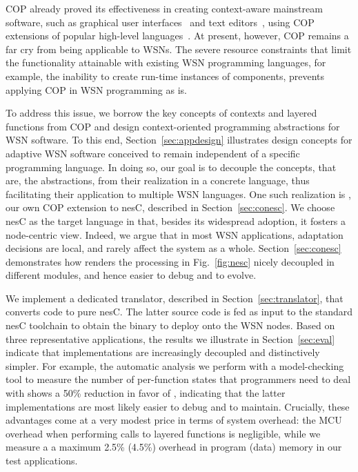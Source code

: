COP already proved its effectiveness in creating context-aware
mainstream software, such as graphical user interfaces~\cite{Keays03}
and text editors~\cite{Kamina11}, using COP extensions of popular
high-level languages~\cite{Salvaneschi12}. At present, however, COP
remains a far cry from being applicable to WSNs. The severe resource
constraints that limit the functionality attainable with existing WSN
programming languages, for example, the inability to create run-time
instances of components, prevents applying COP in WSN programming as
is.

To address this issue, we borrow the key concepts of contexts and
layered functions from COP and design context-oriented programming
abstractions for WSN software. To this end,
Section~\ref{sec:appdesign} illustrates design concepts for adaptive
WSN software conceived to remain independent of a specific programming
language. In doing so, our goal is to decouple the concepts, that are,
the abstractions, from their realization in a concrete language, thus
facilitating their application to multiple WSN languages. One such
realization is \conesc, our own COP extension to nesC, described in
Section~\ref{sec:conesc}. We choose nesC as the target language in
that, besides its widespread adoption, it fosters a node-centric
view. Indeed, we argue that in most WSN applications, adaptation
decisions are local, and rarely affect the system as a
whole. Section~\ref{sec:conesc} demonstrates how \conesc renders the
processing in Fig.~\ref{fig:nesc} nicely decoupled in different
modules, and hence easier to debug and to evolve.

We implement a dedicated translator, described in
Section~\ref{sec:translator}, that converts \conesc code to pure
nesC. The latter source code is fed as input to the standard nesC
toolchain to obtain the binary to deploy onto the WSN nodes. Based on
three representative applications, the results we illustrate in
Section~\ref{sec:eval} indicate that \conesc implementations are
increasingly decoupled and distinctively simpler. For example, the
automatic analysis we perform with a model-checking tool to measure
the number of per-function states that programmers need to deal with
shows a 50\% reduction in favor of \conesc, indicating that the latter
implementations are most likely easier to debug and to
maintain. Crucially, these advantages come at a very modest price in
terms of system overhead: the MCU overhead when performing calls to
layered functions is negligible, while we measure a a maximum 2.5\%
(4.5\%) overhead in program (data) memory in our test applications.

